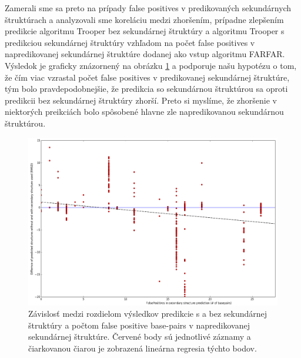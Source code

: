 \indent Zamerali sme sa preto na prípady false positives v predikovaných sekundárnych štruktúrach a analyzovali sme koreláciu medzi zhoršením, prípadne zlepšením predikcie algoritmu Trooper bez sekundárnej štruktúry a algoritmu Trooper s predikciou sekundárnej štruktúry vzhľadom na počet false positives v napredikovanej sekundárnej štruktúre dodanej ako vstup algoritmu FARFAR. Výsledok je graficky znázornený na obrázku \ref{obr5.2} a podporuje našu hypotézu o tom, že čím viac vzrastal počet false positives v predikovanej sekundárnej štruktúre, tým bolo pravdepodobnejšie, že predikcia so sekundárnou štruktúrou sa oproti predikcii bez sekundárnej štruktúry zhorší. Preto si myslíme, že zhoršenie v niektorých preikciách bolo spôsobené hlavne zle napredikovanou sekundárnou štruktúrou.
\begin{figure}%
\includegraphics[width=\textwidth]{../img/corelation}
\caption{Závislosť medzi rozdielom výsledkov predikcie s a bez sekundárnej štruktúry a počtom false positive base-pairs v napredikovanej sekundárnej štruktúre. Červené body sú jednotlivé záznamy a čiarkovanou čiarou je zobrazená lineárna regresia týchto bodov.}
\label{obr5.2}
\end{figure}